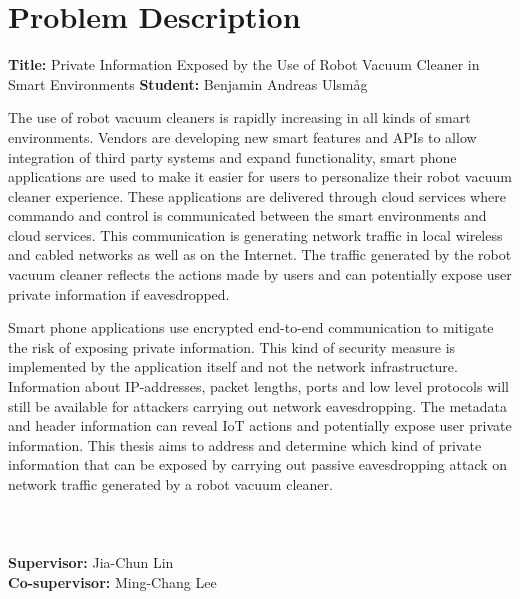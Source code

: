 \chapter*{Problem Description}


\textbf{Title:} Private Information Exposed by the Use of Robot Vacuum Cleaner in Smart Environments
\newline
\textbf{Student:} Benjamin Andreas Ulsmåg
\newline
\newline

The use of robot vacuum cleaners is rapidly increasing in all kinds of smart environments. Vendors are developing new smart features and APIs to allow integration of third party systems and expand functionality, smart phone applications are used to make it easier for users to personalize their robot vacuum cleaner experience. These applications are delivered through cloud services where commando and control is communicated between the smart environments and cloud services. This communication is generating network traffic in local wireless and cabled networks as well as on the Internet. The traffic generated by the robot vacuum cleaner reflects the actions made by users and can potentially expose user private information if eavesdropped. 

Smart phone applications use encrypted end-to-end communication to mitigate the risk of exposing private information. This kind of security measure is implemented by the application itself and not the network infrastructure. Information about IP-addresses, packet lengths, ports and low level protocols will still be available for attackers carrying out network eavesdropping. The metadata and header information can reveal IoT actions and potentially expose user private information. This thesis aims to address and determine which kind of private information that can be exposed by carrying out passive eavesdropping attack on network traffic generated by a robot vacuum cleaner. 
\\\\
\\\\
\textbf{Supervisor:} Jia-Chun Lin
\\
\textbf{Co-supervisor:} Ming-Chang Lee



